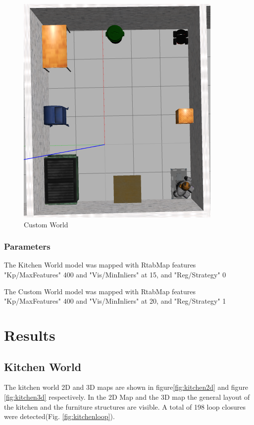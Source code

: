 \documentclass[10pt,journal,compsoc]{IEEEtran}
\begin{document}
\begin{figure}[thpb]
      \centering
      \includegraphics[width=\linewidth]{images/1_world_gz}
      \caption{Custom World}
      \label{fig:customworld}
\end{figure}

\subsubsection{Parameters}
The Kitchen World model was mapped with RtabMap features "Kp/MaxFeatures" 400 and "Vis/MinInliers" at 15, and "Reg/Strategy" 0

The Custom World model was mapped with RtabMap features "Kp/MaxFeatures" 400 and "Vis/MinInliers" at 20, and "Reg/Strategy" 1



\section{Results}

\subsection{Kitchen World}
The kitchen world 2D and 3D maps are shown in figure\ref{fig:kitchen2d} and figure \ref{fig:kitchen3d} respectively. In the 2D Map and the 3D map the general layout of the kitchen and the furniture structures are visible. A total of 198 loop closures were detected(Fig. \ref{fig:kitchenloop}).
\end{document}
